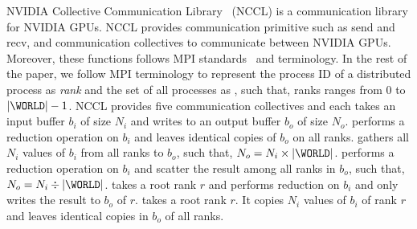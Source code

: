 NVIDIA Collective Communication Library~\cite{nccl} (NCCL) is a communication library for NVIDIA GPUs.
NCCL provides communication primitive such as send and recv, and communication collectives to communicate between NVIDIA GPUs.
Moreover, these functions follows MPI standards~\cite{mpi} and terminology.
In the rest of the paper, we follow MPI terminology to represent the process ID of a distributed process as \emph{rank} and the set of all processes as \WORLD, such that, ranks ranges from $0$ to $|\WORLD|-1$.
NCCL provides five communication collectives and each takes an input buffer $b_i$ of size $N_i$ and writes to an output buffer $b_o$ of size $N_o$.
\emph{\allreduce} performs a reduction operation on $b_i$ and leaves identical copies of $b_o$ on all ranks.
\emph{\allgather} gathers all $N_i$ values of $b_i$ from all ranks to $b_o$, such that, $N_o = N_i \times |\WORLD|$.
\emph{\reducescatter} performs a reduction operation on $b_i$ and scatter the result among all ranks in $b_o$, such that, $N_o = N_i \div |\WORLD|$.
\emph{\reduce} takes a root rank $r$ and performs reduction on $b_i$ and only writes the result to $b_o$ of $r$.
\emph{\broadcast} takes a root rank $r$. It copies $N_i$ values of $b_i$ of rank $r$ and leaves identical copies in $b_o$ of all ranks.
